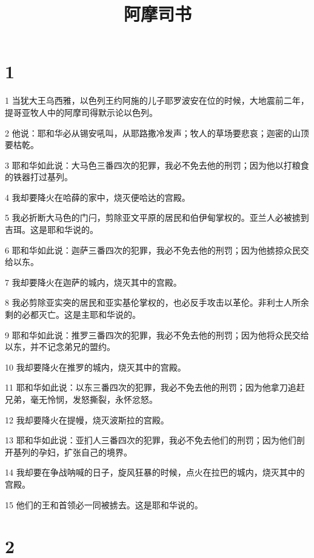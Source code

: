 

\title{阿摩司书}


\chapter{1}

\par 1 当犹大王乌西雅，以色列王约阿施的儿子耶罗波安在位的时候，大地震前二年，提哥亚牧人中的阿摩司得默示论以色列。
\par 2 他说：耶和华必从锡安吼叫，从耶路撒冷发声；牧人的草场要悲哀；迦密的山顶要枯乾。
\par 3 耶和华如此说：大马色三番四次的犯罪，我必不免去他的刑罚；因为他以打粮食的铁器打过基列。
\par 4 我却要降火在哈薛的家中，烧灭便哈达的宫殿。
\par 5 我必折断大马色的门闩，剪除亚文平原的居民和伯伊甸掌权的。亚兰人必被掳到吉珥。这是耶和华说的。
\par 6 耶和华如此说：迦萨三番四次的犯罪，我必不免去他的刑罚；因为他掳掠众民交给以东。
\par 7 我却要降火在迦萨的城内，烧灭其中的宫殿。
\par 8 我必剪除亚实突的居民和亚实基伦掌权的，也必反手攻击以革伦。非利士人所余剩的必都灭亡。这是主耶和华说的。
\par 9 耶和华如此说：推罗三番四次的犯罪，我必不免去他的刑罚；因为他将众民交给以东，并不记念弟兄的盟约。
\par 10 我却要降火在推罗的城内，烧灭其中的宫殿。
\par 11 耶和华如此说：以东三番四次的犯罪，我必不免去他的刑罚；因为他拿刀追赶兄弟，毫无怜悯，发怒撕裂，永怀忿怒。
\par 12 我却要降火在提幔，烧灭波斯拉的宫殿。
\par 13 耶和华如此说：亚扪人三番四次的犯罪，我必不免去他们的刑罚；因为他们剖开基列的孕妇，扩张自己的境界。
\par 14 我却要在争战呐喊的日子，旋风狂暴的时候，点火在拉巴的城内，烧灭其中的宫殿。
\par 15 他们的王和首领必一同被掳去。这是耶和华说的。

\chapter{2}

